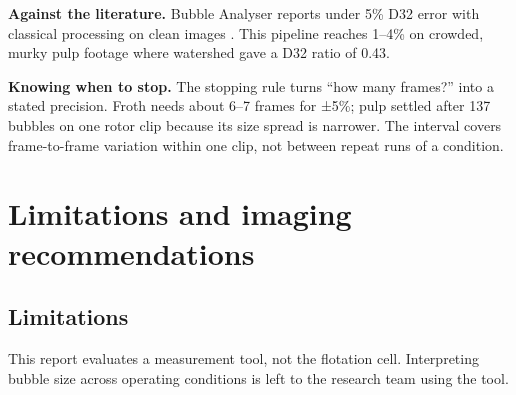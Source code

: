 \textbf{Against the literature.} Bubble Analyser reports under 5\% D32
error with classical processing on clean images \citep{mesa2022}. This
pipeline reaches 1--4\% on crowded, murky pulp footage where watershed
gave a D32 ratio of 0.43.

\textbf{Knowing when to stop.} The stopping rule turns ``how many
frames?'' into a stated precision. Froth needs about 6--7 frames for
±5\%; pulp settled after 137 bubbles on one rotor clip because its size
spread is narrower. The interval covers frame-to-frame variation within
one clip, not between repeat runs of a condition.

\hypertarget{limitations-and-imaging-recommendations}{%
\section{Limitations and imaging
recommendations}\label{limitations-and-imaging-recommendations}}

\hypertarget{limitations}{%
\subsection{Limitations}\label{limitations}}

This report evaluates a measurement tool, not the flotation cell.
Interpreting bubble size across operating conditions is left to the
research team using the tool.

